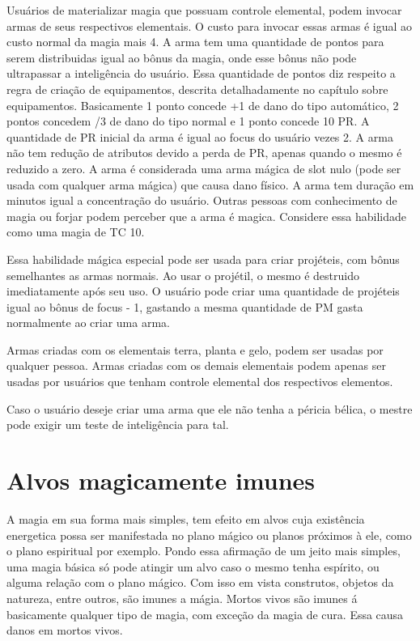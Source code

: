 Usuários de materializar magia que possuam controle elemental, podem invocar armas de seus respectivos elementais. O custo para invocar essas armas é igual ao custo normal da magia mais 4. A arma tem uma quantidade de pontos para serem distribuidas igual ao bônus da magia, onde esse bônus não pode ultrapassar a inteligência do usuário. Essa quantidade de pontos diz respeito a regra de criação de equipamentos, descrita detalhadamente no capítulo sobre equipamentos. Basicamente 1 ponto concede +1 de dano do tipo automático, 2 pontos concedem /3 de dano do tipo normal e 1 ponto concede 10 PR. A quantidade de PR inicial da arma é igual ao focus do usuário vezes 2. A arma não tem redução de atributos devido a perda de PR, apenas quando o mesmo é reduzido a zero. A arma é considerada uma arma mágica de slot nulo (pode ser usada com qualquer arma mágica) que causa dano físico. A arma tem duração em minutos igual a concentração do usuário. Outras pessoas com conhecimento de magia ou forjar podem perceber que a arma é magica. Considere essa habilidade como uma magia de TC 10.

Essa habilidade mágica especial pode ser usada para criar projéteis, com bônus semelhantes as armas normais. Ao usar o projétil, o mesmo é destruido imediatamente após seu uso. O usuário pode criar uma quantidade de projéteis igual ao bônus de focus - 1, gastando a mesma quantidade de PM gasta normalmente ao criar uma arma.

Armas criadas com os elementais terra, planta e gelo, podem ser usadas por qualquer pessoa. Armas criadas com os demais elementais podem apenas ser usadas por usuários que tenham controle elemental dos respectivos elementos.

Caso o usuário deseje criar uma arma que ele não tenha a péricia bélica, o mestre pode exigir um teste de inteligência para tal.


\section{Alvos magicamente imunes}
A magia em sua forma mais simples, tem efeito em alvos cuja existência energetica possa ser manifestada no plano mágico ou planos próximos à ele, como o plano espiritual por exemplo. Pondo essa afirmação de um jeito mais simples, uma magia básica só pode atingir um alvo caso o mesmo tenha espírito, ou alguma relação com o plano mágico. Com isso em vista construtos, objetos da natureza, entre outros, são imunes a mágia. Mortos vivos são imunes á basicamente qualquer tipo de magia, com exceção da magia de cura. Essa causa danos em mortos vivos.

